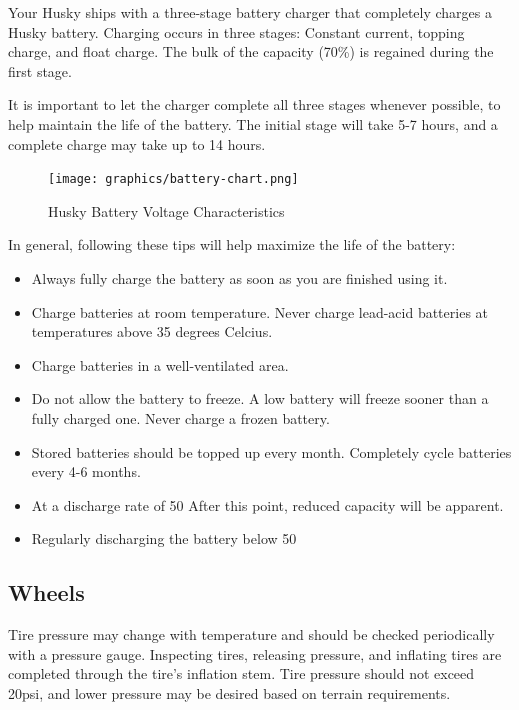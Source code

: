 \documentclass[]{clearpath-latex/clearpath-manual}
\begin{document}
Your Husky ships with a three-stage battery charger that completely charges a Husky battery.
Charging occurs in three stages: Constant current, topping charge, and float charge.
The bulk of the capacity (70\%) is regained during the first stage.

It is important to let the charger complete all three stages whenever possible,
to help maintain the life of the battery.  The initial stage will take 5-7 hours,
and a complete charge may take up to 14 hours.

\begin{figure}[h]
	\centering
	\texttt{[image: graphics/battery-chart.png]}
	\caption{Husky Battery Voltage Characteristics}
	\label{battery-chart}
\end{figure}

In general, following these tips will help maximize the life of the battery:

\begin{itemize}
	\item Always fully charge the battery as soon as you are finished using it.
	\item Charge batteries at room temperature.  Never charge lead-acid batteries at temperatures above 35 degrees Celcius.
	\item Charge batteries in a well-ventilated area.
	\item Do not allow the battery to freeze.  A low battery will freeze sooner than a fully charged one.  Never charge a frozen battery.
	\item Stored batteries should be topped up every month.  Completely cycle batteries every 4-6 months.
	\item At a discharge rate of 50%
	After this point, reduced capacity will be apparent.
	\item Regularly discharging the battery below 50%
\end{itemize}

\subsection{Wheels}
Tire pressure may change with temperature and should be checked periodically with a pressure gauge.
Inspecting tires, releasing pressure, and inflating tires are completed through the tire’s inflation stem.
Tire pressure should not exceed 20psi, and lower pressure may be desired based on terrain requirements.
\end{document}
